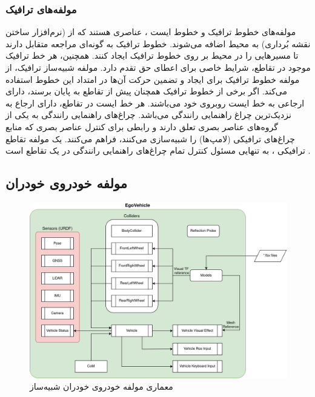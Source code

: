\subsubsection{مولفه‌های ترافیک }
مولفه‌های خطوط ترافیک   و خطوط ایست ،  عناصری هستند که از  (نرم‌افزار ساختن نقشه بُرداری) به محیط اضافه می‌شوند. خطوط ترافیک به گونه‌ای مراجعه متقابل دارند تا مسیرهایی را در محیط  بر روی خطوط ترافیک ایجاد کنند. همچنین، هر خط ترافیک موجود در تقاطع، شرایط خاصی برای اعطای حق تقدم دارد. مولفه شبیه‌ساز ترافیک، از مولفه خطوط ترافیک برای ایجاد  و تضمین حرکت آن‌ها در امتداد این خطوط استفاده می‌کند. اگر برخی از خطوط ترافیک همچنان پیش از تقاطع به پایان برسند، دارای ارجاعی به خط ایست روبروی خود می‌باشند. هر خط ایست در تقاطع، دارای ارجاع به نزدیک‌ترین چراغ راهنمایی رانندگی  می‌باشد. چراغ‌های راهنمایی رانندگی به یکی از گروه‌های عناصر بصری تعلق دارند و رابطی برای کنترل عناصر بصری که منابع چراغ‌های ترافیکی (لامپ‌ها) را شبیه‌سازی می‌کنند، فراهم می‌کنند. یک مولفه تقاطع ترافیکی ، به تنهایی مسئول کنترل تمام چراغ‌های راهنمایی رانندگی در یک تقاطع است \cite{AWSIM:Documentation}.

\subsection{مولفه خودروی خودران}
\begin{figure}[h!]
    \centering
    \includegraphics[width=1\linewidth]{figures/AWSIM_EgoVehicle_Architecture.png}
    \caption{معماری مولفه خودروی خودران شبیه‌ساز  \cite{AWSIM:Documentation}}
    \label{fig:AWSIM_EgoVehicle_Architecture}
\end{figure}

